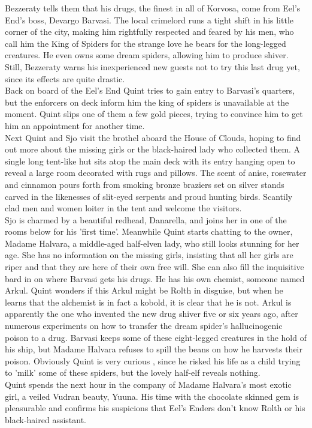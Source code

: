 Bezzeraty tells them that his drugs, the finest in all of Korvosa, come from Eel's End's boss, Devargo Barvasi. The local crimelord runs a tight shift in his little corner of the city, making him rightfully respected and feared by his men, who call him the King of Spiders for the strange love he bears for the long-legged creatures. He even owns some dream spiders, allowing him to produce shiver. Still, Bezzeraty warns his inexperienced new guests not to try this last drug yet, since its effects are quite drastic.\\

Back on board of the Eel's End Quint tries to gain entry to Barvasi's quarters, but the enforcers on deck inform him the king of spiders is unavailable at the moment. Quint slips one of them a few gold pieces, trying to convince him to get him an appointment for another time.\\

Next Quint and Sjo visit the brothel aboard the House of Clouds, hoping to find out more about the missing girls or the black-haired lady who collected them. A single long tent-like hut sits atop the main deck with its entry hanging open to reveal a large room decorated with rugs and pillows. The scent of anise, rosewater and cinnamon pours forth from smoking bronze braziers set on silver stands carved in the likenesses of slit-eyed serpents and proud hunting birds. Scantily clad men and women loiter in the tent and welcome the visitors.\\

Sjo is charmed by a beautiful redhead, Danarella, and joins her in one of the rooms below for his 'first time'. Meanwhile Quint starts chatting to the owner, Madame Halvara, a middle-aged half-elven lady, who still looks stunning for her age. She has no information on the missing girls, insisting that all her girls are riper and that they are here of their own free will. She can also fill the inquisitive bard in on where Barvasi gets his drugs. He has his own chemist, someone named Arkul. Quint wonders if this Arkul might be Rolth in disguise, but when he learns that the alchemist is in fact a kobold, it is clear that he is not. Arkul is apparently the one who invented the new drug shiver five or six years ago, after numerous experiments on how to transfer the dream spider's hallucinogenic poison to a drug. Barvasi keeps some of these eight-legged creatures in the hold of his ship, but Madame Halvara refuses to spill the beans on how he harvests their poison. Obviously Quint is very curious , since he risked his life as a child trying to 'milk' some of these spiders, but the lovely half-elf reveals nothing.\\

Quint spends the next hour in the company of Madame Halvara's most exotic girl, a veiled Vudran beauty, Yuuna. His time with the chocolate skinned gem is pleasurable and confirms his suspicions that Eel's Enders don't know Rolth or his black-haired assistant.\\

